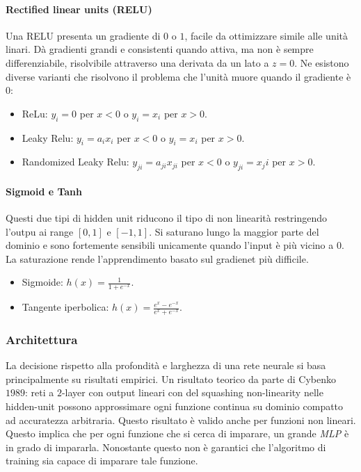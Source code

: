 			\paragraph{Rectified linear units (RELU)}
			Una RELU presenta un gradiente di $0$ o $1$, facile da ottimizzare simile alle unit\`a linari.
			D\`a gradienti grandi e consistenti quando attiva, ma non \`e sempre differenziabile, risolvibile attraverso una derivata da un lato a $z=0$.
			Ne esistono diverse varianti che risolvono il problema che l'unit\`a muore quando il gradiente \`e $0$:
			\begin{multicols}{2}
				\begin{itemize}
					\item ReLu: $y_i = 0$ per $x < 0$ o $y_i = x_i$ per $x >0$.
					\item Leaky Relu: $y_i = a_ix_i$ per $x < 0$ o $y_i = x_i$ per $x >0$.
					\item Randomized Leaky Relu: $y_{ji} = a_{ji}x_{ji}$ per $x < 0$ o $y_{ji} = x_{j}i$ per $x >0$.
				\end{itemize}
			\end{multicols}

			\paragraph{Sigmoid e Tanh}
			Questi due tipi di hidden unit riducono il tipo di non linearit\`a restringendo l'outpu ai range $[0,1]$ e $[-1,1]$.
			Si saturano lungo la maggior parte del dominio e sono fortemente sensibili unicamente quando l'input \`e pi\`u vicino a $0$.
			La saturazione rende l'apprendimento basato sul gradienet pi\`u difficile.
			\begin{multicols}{2}
				\begin{itemize}
					\item Sigmoide: $h(x) = \frac{1}{1+e^{-x}}$.
					\item Tangente iperbolica: $h(x) = \frac{e^x-e^{-x}}{e^x+e^{-x}}$.
				\end{itemize}
			\end{multicols}

		\subsubsection{Architettura}
		La decisione rispetto alla profondit\`a e larghezza di una rete neurale si basa principalmente su risultati empirici.
		Un risultato teorico da parte di Cybenko $1989$: reti a $2$-layer con output lineari con del squashing non-linearity nelle hidden-unit possono approssimare ogni funzione continua su dominio compatto ad accuratezza arbitraria.
		Questo risultato \`e valido anche per funzioni non lineari.
		Questo implica che per ogni funzione che si cerca di imparare, un grande \emph{MLP} \`e in grado di impararla.
		Nonostante questo non \`e garantici che l'algoritmo di training sia capace di imparare tale funzione.

